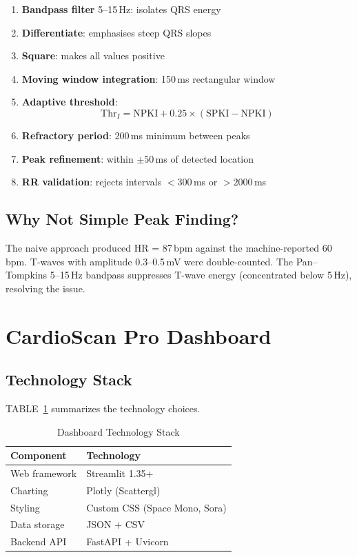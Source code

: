 \documentclass[conference]{IEEEtran}
\begin{document}
\begin{enumerate}[noitemsep,topsep=2pt]
  \item \textbf{Bandpass filter} 5--15\,Hz: isolates QRS energy
  \item \textbf{Differentiate}: emphasises steep QRS slopes
  \item \textbf{Square}: makes all values positive
  \item \textbf{Moving window integration}: 150\,ms rectangular window
  \item \textbf{Adaptive threshold}:
        \begin{equation}
          \text{Thr}_I = \text{NPKI} + 0.25 \times (\text{SPKI} - \text{NPKI})
        \end{equation}
  \item \textbf{Refractory period}: 200\,ms minimum between peaks
  \item \textbf{Peak refinement}: within $\pm 50$\,ms of detected location
  \item \textbf{RR validation}: rejects intervals $< 300$\,ms or $> 2000$\,ms
\end{enumerate}

\subsection{Why Not Simple Peak Finding?}

The naive approach produced HR = 87\,bpm against the machine-reported
60\,bpm. T-waves with amplitude 0.3--0.5\,mV were double-counted. The
Pan--Tompkins 5--15\,Hz bandpass suppresses T-wave energy (concentrated below
5\,Hz), resolving the issue.

\section{CardioScan Pro Dashboard}

\subsection{Technology Stack}

TABLE~\ref{tab:stack} summarizes the technology choices.

\begin{table}[!h]
\centering
\caption{Dashboard Technology Stack}
\label{tab:stack}
\footnotesize
\begin{tabular}{ll}
  \toprule
  \textbf{Component} & \textbf{Technology} \\
  \midrule
  Web framework  & Streamlit 1.35+ \\
  Charting       & Plotly (Scattergl) \\
  Styling        & Custom CSS (Space Mono, Sora) \\
  Data storage   & JSON + CSV \\
  Backend API    & FastAPI + Uvicorn \\
  \bottomrule
\end{tabular}
\end{table}
\end{document}

